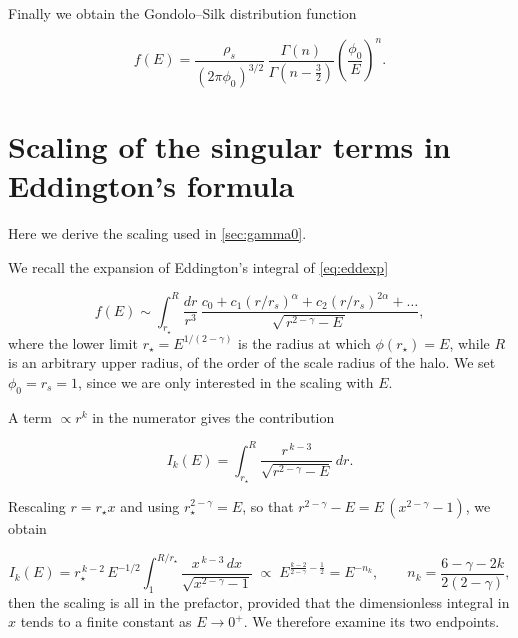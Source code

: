 Finally we obtain the Gondolo--Silk distribution function

\begin{equation}
f(E)
= \frac{\rho_s}{(2\pi\phi_0)^{3/2}}\,
\frac{\Gamma(n)}{\Gamma\!\left(n-\tfrac32\right)}
\left( \frac{\phi_0}{E} \right)^{n} .
\end{equation}





\section{Scaling of the singular terms in Eddington's formula}
\label{app:nkscaling}

Here we derive the scaling used in \cref{sec:gamma0}.

We recall the expansion of Eddington's integral of \cref{eq:eddexp}


\begin{equation} \label{eq:app_eddexp}
f(E)
\sim
\int_{r_\star}^{R} \frac{dr}{r^{3}}\,
\frac{c_0 + c_1 (r/r_s)^{\alpha} + c_2 (r/r_s)^{2\alpha} + \dots}
{\sqrt{\, r^{2-\gamma} - E \,}},
\end{equation}
where the lower limit $r_\star = E^{1/(2-\gamma)}$ is the radius at which
$\phi(r_\star) = E$, while $R$ is an arbitrary upper radius, of the order
of the scale radius of the halo.
We set $\phi_0 = r_s = 1$, since we
are only interested in the scaling with $E$.


A term $\propto r^{k}$ in the numerator gives the contribution


\begin{equation} \label{eq:app_Ik}
I_k(E) = \int_{r_\star}^{R}
\frac{r^{\,k-3}}{\sqrt{r^{2-\gamma} - E}}\, dr .
\end{equation}

Rescaling $r = r_\star x$ and using $r_\star^{2-\gamma} = E$, so that
$r^{2-\gamma} - E = E\,(x^{2-\gamma}-1)$, we obtain

\begin{equation} \label{eq:app_nk}
I_k(E) = r_\star^{\,k-2}\, E^{-1/2}
\int_1^{R/r_\star} \frac{x^{\,k-3}\, dx}{\sqrt{x^{2-\gamma}-1}}
\;\propto\; E^{\frac{k-2}{2-\gamma} - \frac{1}{2}}
= E^{-n_k},
\qquad
n_k = \frac{6-\gamma-2k}{2(2-\gamma)} ,
\end{equation}
then the scaling is all in the prefactor, provided that the dimensionless integral in $x$ tends to a finite constant as
$E \to 0^{+}$. We therefore examine its two endpoints.

